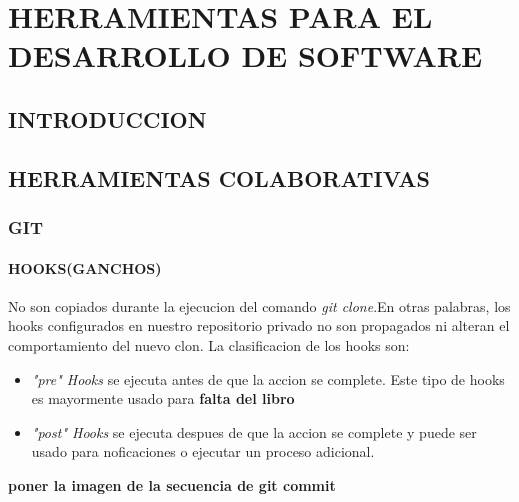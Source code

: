 

%
\chapter{HERRAMIENTAS PARA EL DESARROLLO DE SOFTWARE}
\section{INTRODUCCION}
\section{HERRAMIENTAS COLABORATIVAS}
\subsection{GIT}
\subsubsection{HOOKS(GANCHOS)}
No son copiados durante la ejecucion del comando \textit{git clone}.En otras palabras, los hooks configurados en nuestro repositorio privado no son propagados ni alteran el 
comportamiento del nuevo clon.
La clasificacion de los hooks son:
\begin{itemize}
 \item \textit{"pre" Hooks} se ejecuta antes de que la accion se complete. Este tipo de hooks es mayormente usado para \textbf{falta del libro}
 \item \textit{"post" Hooks} se ejecuta despues de que la accion se complete y puede ser usado para noficaciones o ejecutar un proceso adicional.
\end{itemize}

\textbf{poner la imagen de la secuencia de git commit}

%
